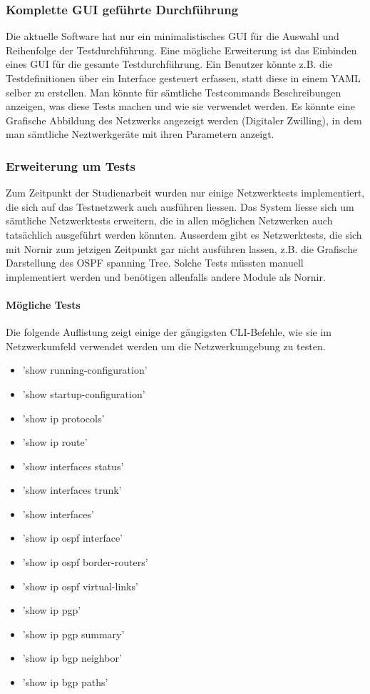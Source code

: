 \documentclass[]{subfiles}
\begin{document}
\subsubsection*{Komplette GUI geführte Durchführung}
Die aktuelle Software hat nur ein minimalistisches GUI für die Auswahl und Reihenfolge
der Testdurchführung. 
Eine mögliche Erweiterung ist das Einbinden eines GUI für die gesamte Testdurchführung.
Ein Benutzer könnte z.B. die Testdefinitionen über ein Interface gesteuert erfassen, 
statt diese in einem YAML selber zu erstellen. 
Man könnte für sämtliche Testcommands Beschreibungen anzeigen, was diese Tests machen
und wie sie verwendet werden. 
Es könnte eine Grafische Abbildung des Netzwerks angezeigt werden (Digitaler Zwilling), 
in dem man sämtliche Neztwerkgeräte mit ihren Parametern anzeigt. 

\subsubsection*{Erweiterung um Tests}
Zum Zeitpunkt der Studienarbeit wurden nur einige Netzwerktests implementiert, die 
sich auf das Testnetzwerk auch ausführen liessen. 
Das System liesse sich um sämtliche Netzwerktests erweitern, die in allen möglichen 
Netzwerken auch tatsächlich ausgeführt werden könnten.
Ausserdem gibt es Netzwerktests, die sich mit Nornir zum jetzigen Zeitpunkt gar nicht
ausführen lassen, z.B. die Grafische Darstellung des OSPF spanning Tree. 
Solche Tests müssten manuell implementiert werden und benötigen allenfalls andere 
Module als Nornir.

\paragraph{Mögliche Tests}
Die folgende Auflistung zeigt einige der gängigsten CLI-Befehle, wie sie im Netzwerkumfeld
verwendet werden um die Netzwerkumgebung zu testen. 

\begin{itemize}
    \item 'show running-configuration'
    \item 'show startup-configuration'
    \item 'show ip protocols'
    \item 'show ip route'
    \item 'show interfaces status'
    \item 'show interfaces trunk'
    \item 'show interfaces'
    \item 'show ip ospf interface'
    \item 'show ip ospf border-routers'
    \item 'show ip ospf virtual-links'
    \item 'show ip pgp'
    \item 'show ip pgp summary'
    \item 'show ip bgp neighbor'
    \item 'show ip bgp paths'
\end{itemize}
\end{document}
